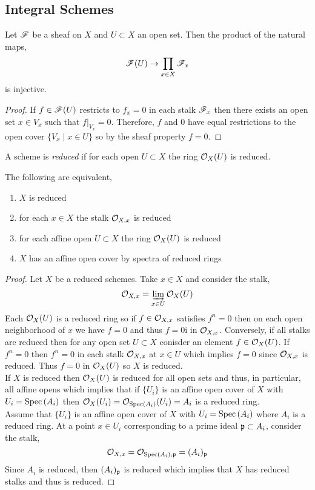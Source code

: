 \documentclass[12pt]{article}
\begin{document}
\subsection{Integral Schemes}

\begin{lemma}
Let $\mathscr{F}$ be a sheaf on $X$ and $U \subset X$ an open set. Then the product of the natural maps,
\[ \mathscr{F}(U) \to \prod_{x \in X} \mathscr{F}_x \]
is injective.
\end{lemma}

\begin{proof}
If $f \in \mathscr{F}(U)$ restricts to $f_x = 0$ in each stalk $\mathscr{F}_x$ then there exists an open set $x \in V_x$ such that $f |_{V_x} = 0$. Therefore, $f$ and $0$ have equal restrictions to the open cover $\{ V_x \mid x \in U \}$ so by the sheaf property $f = 0$. 
\end{proof}

\begin{definition}
A scheme is \textit{reduced} if for each open $U \subset X$ the ring $\mathcal{O}_{X}(U)$ is reduced.
\end{definition}

\begin{proposition}
The following are equivalent,
\begin{enumerate}
\item $X$ is reduced
\item for each $x \in X$ the stalk $\mathcal{O}_{X, x}$ is reduced
\item for each affine open $U \subset X$ the ring $\mathcal{O}_{X}(U)$ is reduced
\item $X$ has an affine open cover by spectra of reduced rings
\end{enumerate}
\end{proposition}

\begin{proof}
Let $X$ be a reduced schemes. Take $x \in X$ and consider the stalk,
\[ \mathcal{O}_{X, x} = \varinjlim_{x \in U} \mathcal{O}_{X}(U) \]
Each $\mathcal{O}_{X}(U)$ is a reduced ring so if $f \in \mathcal{O}_{X, x}$ satisfies $f^n = 0$ then on each open neighborhood of $x$ we have $f = 0$ and thus $f = 0$i in $\mathcal{O}_{X, x}$. Conversely, if all stalks are reduced then for any open set $U \subset X$ conisder an element $f \in \mathcal{O}_{X}(U)$. If $f^n = 0$ then $f^n = 0$ in each stalk $\mathcal{O}_{X, x}$ at $x \in U$ which implies $f = 0$ since $\mathcal{O}_{X, x}$ is reduced. Thus $f = 0$ in $\mathcal{O}_{X}(U)$ so $X$ is reduced. 
\bigskip\\
If $X$ is reduced then $\mathcal{O}_{X}(U)$ is reduced for all open sets and thus, in particular, all affine opens which implies that if $\{U_i\}$ is an affine open cover of $X$ with $U_i = \mathrm{Spec}\left( A_i \right)$ then $\mathcal{O}_{X}(U_i) = \mathcal{O}_{\mathrm{Spec}\left( A_i \right)}(U_i) = A_i$ is a reduced ring.
\bigskip\\
Assume that $\{ U_i \}$ is an affine open cover of $X$ with $U_i = \mathrm{Spec}\left( A_i \right)$ where $A_i$ is a reduced ring. At a point $x \in U_i$ corresponding to a prime ideal $\mathfrak{p} \subset A_i$, consider the stalk,
\[ \mathcal{O}_{X, x} = \mathcal{O}_{\mathrm{Spec}\left( A_i \right), \mathfrak{p}} = (A_i)_{\mathfrak{p}} \]
Since $A_i$ is reduced, then $(A_i)_{\mathfrak{p}}$ is reduced which implies that $X$ has reduced stalks and thus is reduced. 
\end{proof}
\end{document}
